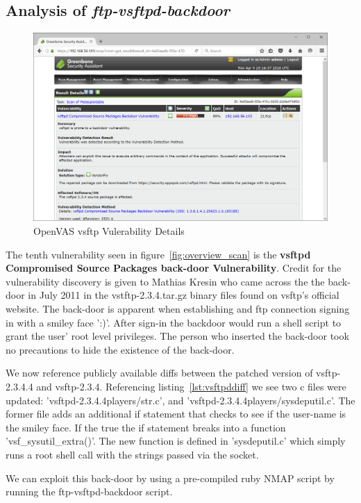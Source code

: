 \documentclass[12pt]{article}
\begin{document}
\subsection{Analysis of \textit{ftp-vsftpd-backdoor}}
\label{sec:vul1}
\begin{figure}[H]
    \centering
    \includegraphics[width=5.5in]{images/20160403-vul1-vsftp.PNG}
    \caption{OpenVAS vsftp Vulerability Details}
    \label{fig:fsftp}
\end{figure}
The tenth vulnerability seen in figure~\ref{fig:overview_scan}
is the \textbf{vsftpd Compromised Source Packages back-door Vulnerability}.
Credit for the vulnerability discovery is given to Mathias Kresin who came 
across the the back-door in July 2011 in the vstftp-2.3.4.tar.gz 
binary files found on vsftp's official website. The back-door is apparent 
when establishing and ftp connection signing in with a smiley face ':)'. 
After sign-in the backdoor would run a shell script to grant the user'
root level privileges. The person who inserted the back-door took no 
precautions to hide the existence of the back-door. 

We now reference publicly available diffs between the patched version of 
vsftp-2.3.4.4 and vsftp-2.3.4. Referencing listing~\ref{lst:vsftpddiff}
we see two c files were updated: 'vsftpd-2.3.4.4players/str.c', and 
'vsftpd-2.3.4.4players/sysdeputil.c'.  The former file adds an additional
if statement that checks to see if the user-name is the smiley face. If
the true the if statement breaks into a function 'vsf\_sysutil\_extra()'. 
The new function is defined in 'sysdeputil.c' which simply runs a root
shell call with the strings passed via the socket. 

We can exploit this back-door by using a pre-compiled ruby NMAP script by 
running the ftp-vsftpd-backdoor script. 
\end{document}
